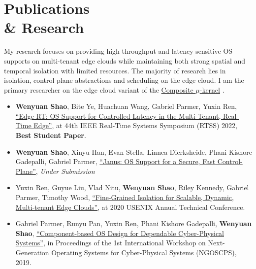 \section{Publications\\ \& Research}
{\hspace*{1.7em} My research focuses on providing high throughput and latency sensitive OS supports on multi-tenant edge clouds while maintaining both strong spatial and temporal isolation with limited resources.
The majority of research lies in isolation, control plane abstractions and scheduling on the edge cloud.
I am the primary researcher on the edge cloud variant of the \href{https://composite.seas.gwu.edu/}{Composite $\mu$-kernel} .}

\vspace{0.2em}
\begin{itemize}[leftmargin=*]
  \setlength\itemsep{-0.0em}
  \item \textbf{Wenyuan Shao}, Bite Ye, Huachuan Wang, Gabriel Parmer, Yuxin Ren, \href{https://www2.seas.gwu.edu/~gparmer/publications/rtss22edgert.pdf}{\enquote{Edge-RT: OS Support for Controlled Latency in the Multi-Tenant, Real-Time Edge}}, at 44th IEEE Real-Time Systems Symposium (RTSS) 2022, \textbf{Best Student Paper}.
  \item \textbf{Wenyuan Shao}, Xinyu Han, Evan Stella, Linnea Dierksheide, Phani Kishore Gadepalli, Gabriel Parmer, \href{}{\enquote{Janus: OS Support for a Secure, Fast Control-Plane}}, \textit{Under Submission}
  \item Yuxin Ren, Guyue Liu, Vlad Nitu, \textbf{Wenyuan Shao}, Riley Kennedy, Gabriel Parmer, Timothy Wood, \href{https://www.usenix.org/system/files/atc20-ren.pdf}{\enquote{Fine-Grained Isolation for Scalable, Dynamic, Multi-tenant Edge Clouds}}, at 2020 USENIX Annual Technical Conference.
  \item Gabriel Parmer, Runyu Pan, Yuxin Ren, Phani Kishore Gadepalli, \textbf{Wenyuan Shao}, \href{https://www2.seas.gwu.edu/~gparmer/publications/ngoscps_19.pdf}{\enquote{Component-based OS Design for Dependable Cyber-Physical Systems}}, in Proceedings of the 1st International Workshop on Next-Generation Operating Systems for Cyber-Physical Systems (NGOSCPS), 2019.
\end{itemize} 

